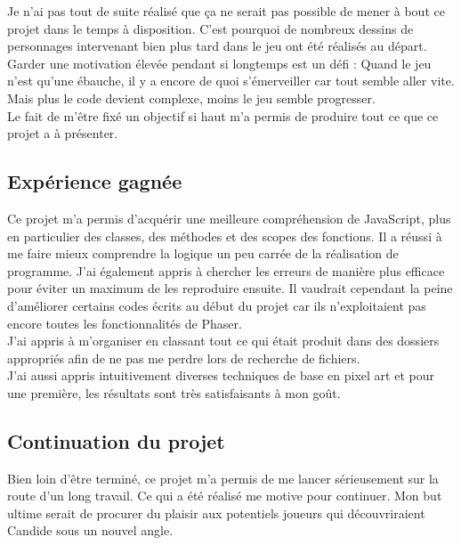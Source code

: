 \documentclass[11pt]{article}
\begin{document}
Je n'ai pas tout de suite réalisé que ça ne serait pas possible de mener à bout ce projet dans le temps à disposition. C'est pourquoi de nombreux dessins de personnages intervenant bien plus tard dans le jeu ont été réalisés au départ. Garder une motivation élevée pendant si longtemps est un défi : Quand le jeu n'est qu'une ébauche, il y a encore de quoi s'émerveiller car tout semble aller vite. Mais plus le code devient complexe, moins le jeu semble progresser.\\
 Le fait de m'être fixé un objectif si haut m'a permis de produire tout ce que ce projet a à présenter.
\subsection{Expérience gagnée}
Ce projet m'a permis d'acquérir une meilleure compréhension de JavaScript, plus en particulier des classes, des méthodes et des scopes des fonctions. Il a réussi à me faire mieux comprendre la logique un peu carrée de la réalisation de programme. J'ai également appris à chercher les erreurs de manière plus efficace pour éviter un maximum de les reproduire ensuite. Il vaudrait cependant la peine d'améliorer certains codes écrits au début du projet car ils n'exploitaient pas encore toutes les fonctionnalités de Phaser.\\ 

J'ai appris à m'organiser en classant tout ce qui était produit dans des dossiers appropriés afin de ne pas me perdre lors de recherche de fichiers.\\

J'ai aussi appris intuitivement diverses techniques de base en pixel art et pour une première, les résultats sont très satisfaisants à mon goût. 
\subsection{Continuation du projet}
Bien loin d'être terminé, ce projet m'a permis de me lancer sérieusement sur la route d'un long travail. Ce qui a été réalisé me motive pour continuer. Mon but ultime serait de procurer du plaisir aux potentiels joueurs qui découvriraient Candide sous un nouvel angle. 
\end{document}
